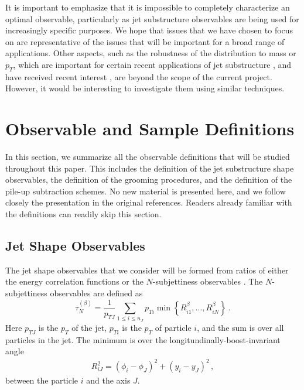\documentclass[11pt,letterpaper]{article}
\newcommand{\Nsub}[2]{\tau_{#1}^{(#2)}}
\begin{document}
It is important to emphasize that it is impossible to completely
characterize an optimal observable, particularly as jet substructure
observables are being used for increasingly specific
purposes.
%
We hope that issues that we have chosen to focus on
are representative of the issues that will be important for a broad
range of applications.
%
Other aspects, such as the robustness of the distribution to mass or $p_T$, which are important for certain recent applications of jet substructure \cite{Sirunyan:2017dgc,CMS-PAS-HIG-17-010,CMS-PAS-EXO-17-001,Sirunyan:2017dnz,Sirunyan:2017nvi,Aaboud:2018zba}, and have received recent interest \cite{Shimmin:2017mfk,Aguilar-Saavedra:2017rzt,Moult:2017okx}, are
beyond the scope of the current project.
However, it would be interesting to investigate them
using similar techniques.




\section{Observable and Sample Definitions}\label{sec:obs_def}

In this section, we summarize all the observable definitions that will be studied throughout this paper.
%
This includes the definition of the jet substructure shape observables, the definition of the grooming procedures, and the definition of the pile-up subtraction schemes.
%
No new material is presented here, and we follow closely the presentation in the original references.
%
Readers already familiar with the definitions can readily skip this section.



\subsection{Jet Shape Observables}\label{sec:shape_def}

The jet shape observables that we consider will be formed from ratios of either the energy correlation functions \cite{Larkoski:2013eya,Moult:2016cvt} or the $N$-subjettiness observables \cite{Thaler:2010tr,Thaler:2011gf}.
%
The $N$-subjettiness observables are defined as \cite{Stewart:2010tn,Thaler:2010tr,Thaler:2011gf}
%
\begin{equation}\label{eq:nsubdef}
\Nsub{N}{\beta} = \frac{1}{p_{TJ}}\sum_{1\leq i \leq n_J} p_{Ti}\min\left\{
R_{i1}^\beta,\dotsc,R_{iN}^\beta
\right\} \ .
\end{equation}
%
Here $p_{TJ}$ is the $p_T$ of the jet, $p_{Ti}$ is the $p_T$ of particle $i$, and the sum is over all particles in the jet.
%
The minimum is over the longitundinally-boost-invariant angle
%
\begin{align}\label{eq:ptratio}  
R_{iJ}^2 = (\phi_i-\phi_J)^2+(y_i-y_J)^2\,,
\end{align}
%
between the particle $i$ and the axis $J$.
\end{document}

